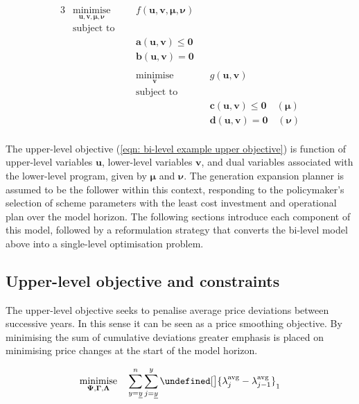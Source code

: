 \documentclass{article}
\let\norm\undefined %
\DeclarePairedDelimiter\norm{\lVert}{\rVert}
\DeclareMathOperator*{\minimise}{minimise}
\begin{document}
\begin{alignat}{3}
& \minimise\limits_{\bm{u}, \bm{v}, \bm{\mu}, \bm{\nu}} \quad && f\left(\bm{u}, \bm{v}, \bm{\mu}, \bm{\nu}\right) \label{eqn: bi-level example upper objective}\\
& \textrm{subject to} \nonumber\\
& && \bm{a}(\bm{u}, \bm{v}) \leq \bm{0}\\
& && \bm{b}(\bm{u}, \bm{v}) = \bm{0}\\
&\nonumber \\
& && \minimise\limits_{\bm{v}} \quad && g(\bm{u}, \bm{v})\\
& && \textrm{subject to} \nonumber\\
& && && \bm{c}(\bm{u}, \bm{v}) \leq \bm{0} \quad \left(\bm{\mu}\right) \\
& && && \bm{d}(\bm{u}, \bm{v}) = \bm{0} \quad \left(\bm{\nu}\right)\\\nonumber
\end{alignat}

The upper-level objective (\ref{eqn: bi-level example upper objective}) is function of upper-level variables $\bm{u}$, lower-level variables $\bm{v}$, and dual variables associated with the lower-level program, given by $\bm{\mu}$ and $\bm{\nu}$. The generation expansion planner is assumed to be the follower within this context, responding to the policymaker's selection of scheme parameters with the least cost investment and operational plan over the model horizon. The following sections introduce each component of this model, followed by a reformulation strategy that converts the bi-level model above into a single-level optimisation problem.

\subsection{Upper-level objective and constraints}
The upper-level objective seeks to penalise average price deviations between successive years. In this sense it can be seen as a price smoothing objective. By minimising the sum of cumulative deviations greater emphasis is placed on minimising price changes at the start of the model horizon.

\begin{equation}
	\minimise\limits_{\bm{\Psi}, \bm{\Gamma}, \bm{\Lambda}} \quad \sum\limits_{\iYear=\iYearStart}^{\iYearTransition} \sum\limits_{\iYearAlias=\iYearStart}^{\iYear} \norm[\big]{\dAveragePrice[\iYearAlias] - \dAveragePrice[\iYearAlias-1]}_{1}
	\label{eqn: upper-level objective}
\end{equation}
\end{document}
